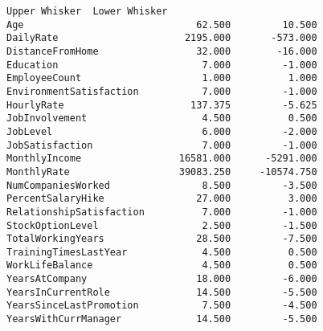 \documentclass[11pt]{article}
\makeatletter
\newcommand{\boxspacing}{\kern\kvtcb@left@rule\kern\kvtcb@boxsep}
\newcommand{\prompt}[4]{
        {\ttfamily\llap{{\color{#2}[#3]:\hspace{3pt}#4}}\vspace{-\baselineskip}}
    }
\makeatother
\begin{document}
            \begin{tcolorbox}[breakable, size=fbox, boxrule=.5pt, pad at break*=1mm, opacityfill=0]
\prompt{Out}{outcolor}{7}{\boxspacing}
\begin{Verbatim}[commandchars=\\\{\}]
                          Upper Whisker  Lower Whisker
Age                              62.500         10.500
DailyRate                      2195.000       -573.000
DistanceFromHome                 32.000        -16.000
Education                         7.000         -1.000
EmployeeCount                     1.000          1.000
EnvironmentSatisfaction           7.000         -1.000
HourlyRate                      137.375         -5.625
JobInvolvement                    4.500          0.500
JobLevel                          6.000         -2.000
JobSatisfaction                   7.000         -1.000
MonthlyIncome                 16581.000      -5291.000
MonthlyRate                   39083.250     -10574.750
NumCompaniesWorked                8.500         -3.500
PercentSalaryHike                27.000          3.000
RelationshipSatisfaction          7.000         -1.000
StockOptionLevel                  2.500         -1.500
TotalWorkingYears                28.500         -7.500
TrainingTimesLastYear             4.500          0.500
WorkLifeBalance                   4.500          0.500
YearsAtCompany                   18.000         -6.000
YearsInCurrentRole               14.500         -5.500
YearsSinceLastPromotion           7.500         -4.500
YearsWithCurrManager             14.500         -5.500
\end{Verbatim}
\end{tcolorbox}
        
\end{document}
